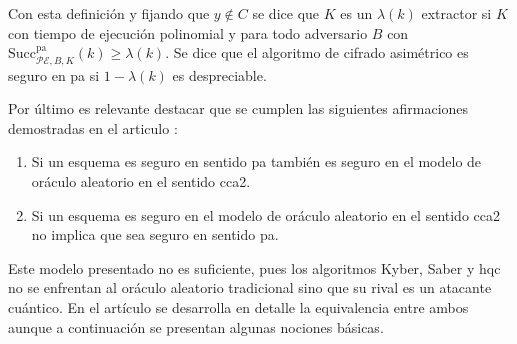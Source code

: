 Con esta definición y fijando que \(y\notin C\) se dice que \(K\) es un $\lambda(k)$ extractor si \(K\) con tiempo de ejecución polinomial y para todo adversario \(B\) con  $\text{Succ}_{\mathcal{PE},B,K}^{\text{pa}}(k)\ge \lambda(k)$. Se dice que el algoritmo de cifrado asimétrico es seguro en \acrshort{pa} si \(1-\lambda(k)\) es despreciable.
\newline

Por último es relevante destacar que se cumplen las siguientes afirmaciones demostradas en el articulo \cite{CCA2}:
\begin{enumerate}
	\item Si un esquema es seguro en sentido \acrshort{pa} también es seguro en el modelo de oráculo aleatorio en el sentido \acrshort{cca2}.
	\item Si un esquema es seguro en el modelo de oráculo aleatorio en el sentido \acrshort{cca2} no implica que sea seguro en sentido \acrshort{pa}.
\end{enumerate}

Este modelo presentado no es suficiente, pues los algoritmos Kyber, Saber y \acrshort{hqc} no se enfrentan al oráculo aleatorio tradicional sino que su rival es un atacante cuántico. En el artículo \cite{QROM} se desarrolla en detalle la equivalencia entre ambos aunque a continuación se presentan algunas nociones básicas.
\newline

